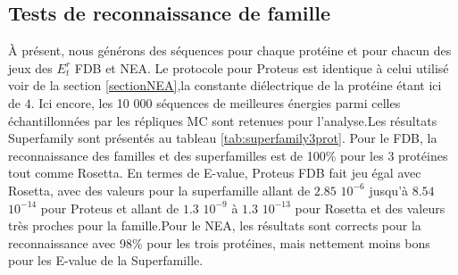     
\subsection{Tests de reconnaissance de famille}
À présent, nous générons des séquences pour chaque protéine et pour chacun des jeux des $E_t^r$ FDB et NEA. Le protocole pour Proteus est identique à celui utilisé voir de la section \ref{sectionNEA},la constante diélectrique de la protéine étant ici de $4$. Ici encore, les 10 000 séquences de meilleures énergies parmi celles échantillonnées par les répliques MC sont retenues pour l'analyse.Les résultats Superfamily sont présentés au tableau \ref{tab:superfamily3prot}. Pour le FDB, la reconnaissance des familles et des superfamilles est de 100\% pour les 3 protéines tout comme Rosetta. En termes de E-value, Proteus FDB fait jeu égal avec Rosetta, avec des valeurs pour la superfamille allant de $2.85$ $10^{-6}$ jusqu'à $8.54$ $10^{-14}$ pour Proteus et allant de $1.3$ $10^{-9}$ à $1.3$ $10^{-13}$ pour Rosetta et des valeurs très proches pour la famille.Pour le NEA, les résultats sont corrects pour la reconnaissance avec 98\% pour les trois protéines, mais nettement moins bons pour les E-value de la Superfamille. 


